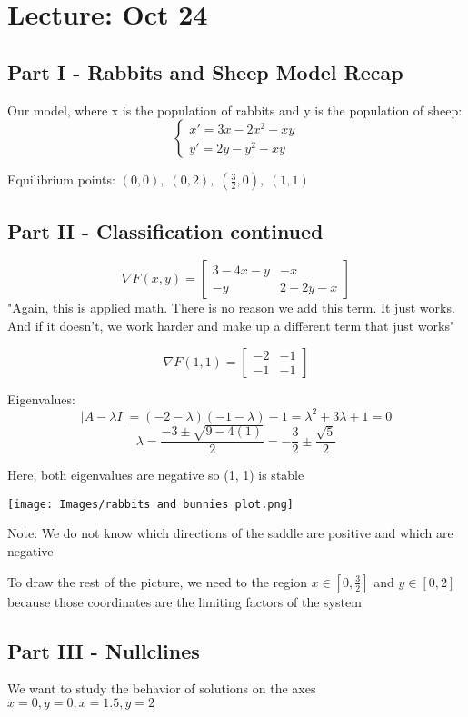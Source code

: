 \documentclass[12pt]{article}
\begin{document}
\section{Lecture: Oct 24}
\subsection*{Part I - Rabbits and Sheep Model Recap}
Our model, where x is the population of rabbits and y is the population of sheep:
\[\begin{cases}
    x' = 3x - 2x^2 - xy\\
    y' = 2y - y^2 - xy
\end{cases}\]

Equilibrium points: $(0, 0), \; (0, 2), \; (\frac{3}{2}, 0),\; (1, 1)$

\subsection*{Part II - Classification continued}
\[\nabla F(x, y) = \begin{bmatrix}
    3 - 4x - y & -x\\
    -y & 2 - 2y - x
\end{bmatrix}\]
"Again, this is applied math. There is no reason we add this term. It just works. And if it doesn't, we work harder and make up a different term that just works"

\[\nabla F(1, 1) = \begin{bmatrix}
    -2 & -1\\
    -1 & -1
\end{bmatrix}\] 

Eigenvalues:
\[| A - \lambda I | = (-2 - \lambda)(-1 - \lambda) - 1 = \lambda^2 + 3 \lambda + 1 = 0\]
\[\lambda = \frac{-3 \pm \sqrt{9 - 4(1)}}{2} = -\frac{3}{2} \pm \frac{\sqrt{5}}{2}\]

Here, both eigenvalues are negative so (1, 1) is stable

\texttt{[image: Images/rabbits and bunnies plot.png]}

Note: We do not know which directions of the saddle are positive and which are negative

To draw the rest of the picture, we need to the region $x \in [0, \frac{3}{2}]$ and $y \in [0, 2]$ because those coordinates are the limiting factors of the system 

\subsection*{Part III - Nullclines}
We want to study the behavior of solutions on the axes $x = 0, y = 0, x = 1.5, y = 2$
\end{document}

